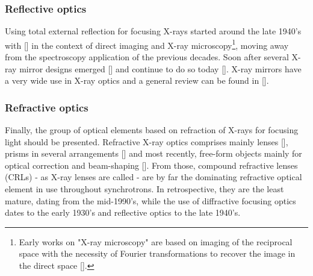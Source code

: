 \begin{refsection}
\subsubsection*{Reflective optics}

Using total external reflection for focusing X-rays started around the late 1940's with [\cite{Ehrenberg1947, Kirkpatrick1948, Ehrenberg1949, Kirkpatrick1950}] in the context of direct imaging and X-ray microscopy\footnote{Early works on "X-ray microscopy" are based on imaging of the reciprocal space with the necessity of Fourier transformations to recover the image in the direct space [\cite{Bragg1939,Bragg1942}].}, moving away from the spectroscopy application of the previous decades. Soon after several X-ray mirror designs emerged [\cite{Wolter1952,Montel1957}] and continue to do so today [\cite{refNewMirrors}]. X-ray mirrors have a very wide use in X-ray optics and a general review can be found in [\cite{Howells1993,Susini1993}].

\subsubsection*{Refractive optics}

Finally, the group of optical elements based on refraction of X-rays for focusing light should be presented. Refractive X-ray optics comprises mainly lenses [\cite{Snigirev1996}], prisms in several arrangements [\cite{Cederstrom2000, Jark2004}] and most recently, free-form objects mainly for optical correction and beam-shaping [\cite{Seiboth2017, Zverev2017, Seiboth2019, Seiboth2020, Dhamgaye2020}]. From those, compound refractive lenses (CRLs) - as X-ray lenses are called - are by far the dominating refractive optical element in use throughout synchrotrons. In retrospective, they are the least mature, dating from the mid-1990's, while the use of diffractive focusing optics dates to the early 1930's and reflective optics to the late 1940's. 



\end{refsection}
